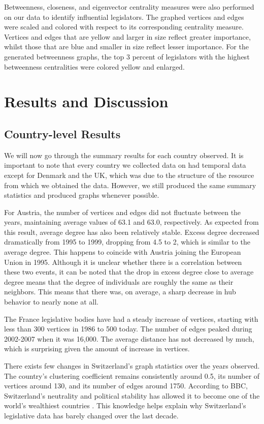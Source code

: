 \documentclass[12pt]{article}
\begin{document}
\begin{multicols*}{2}
Betweenness, closeness, and eigenvector centrality measures were also performed on our data to identify influential legislators. The graphed vertices and edges were scaled and colored with respect to its corresponding centrality measure. Vertices and edges that are yellow and larger in size reflect greater importance, whilst those that are blue and smaller in size reflect lesser importance. For the generated betweenness graphs, the top 3 percent of legislators with the highest betweenness centralities were colored yellow and enlarged.

\section{Results and Discussion}
\subsection{Country-level Results}
We will now go through the summary results for each country observed. It is important to note that every country we collected data on had temporal data except for Denmark and the UK, which was due to the structure of the resource from which we obtained the data. However, we still produced the same summary statistics and produced graphs whenever possible.

For Austria, the number of vertices and edges did not fluctuate between the years, maintaining average values of 63.1 and 63.0, respectively. As expected from this result, average degree has also been relatively stable. Excess degree decreased dramatically from 1995 to 1999, dropping from 4.5 to 2, which is similar to the average degree. This happens to coincide with Austria joining the European Union in 1995. Although it is unclear whether there is a correlation between these two events, it can be noted that the drop in excess degree close to average degree means that the degree of individuals are roughly the same as their neighbors. This means that there was, on average, a sharp decrease in hub behavior to nearly none at all.

The France legislative bodies have had a steady increase of vertices, starting with less than 300 vertices in 1986 to 500 today. The number of edges peaked during 2002-2007 when it was 16,000. The average distance has not decreased by much, which is surprising given the amount of increase in vertices.

There exists few changes in Switzerland's graph statistics over the years observed. The country's clustering coefficient remains consistently around 0.5, its number of vertices around 130, and its number of edges around 1750. According to BBC, Switzerland's neutrality and political stability has allowed it to become one of the world's wealthiest countries \cite{switzerland}. This knowledge helps explain why Switzerland's legislative data has barely changed over the last decade.


\end{multicols*}
\end{document}
